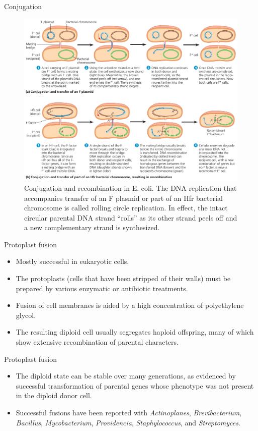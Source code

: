 \documentclass[ignorenonframetext,aspectratio=169]{beamer}
\providecommand{\tightlist}{%
  \setlength{\itemsep}{0pt}\setlength{\parskip}{0pt}}
\begin{document}
\begin{frame}{Conjugation}
\protect\hypertarget{conjugation-2}{}

\begin{figure}
\includegraphics[width=0.5\linewidth]{./../images/bacterial_conjugation2} \caption{Conjugation and recombination in E. coli. The DNA replication that accompanies transfer of an F plasmid or part of an Hfr bacterial chromosome is called rolling circle replication. In effect, the intact circular parental DNA strand “rolls” as its other strand peels off and a new complementary strand is synthesized.}\label{fig:conjugation2}
\end{figure}

\end{frame}

\begin{frame}{Protoplast fusion}
\protect\hypertarget{protoplast-fusion}{}

\begin{itemize}
\tightlist
\item
  Mostly successful in eukaryotic cells.
\item
  The protoplasts (cells that have been stripped of their walls) must be
  prepared by various enzymatic or antibiotic treatments.
\item
  Fusion of cell membranes is aided by a high concentration of
  polyethylene glycol.
\item
  The resulting diploid cell usually segregates haploid offspring, many
  of which show extensive recombination of parental characters.
\end{itemize}

\end{frame}

\begin{frame}{Protoplast fusion}
\protect\hypertarget{protoplast-fusion-1}{}

\begin{itemize}
\tightlist
\item
  The diploid state can be stable over many generations, as evidenced by
  successful transformation of parental genes whose phenotype was not
  present in the diploid donor cell.
\item
  Successful fusions have been reported with \emph{Actinoplanes},
  \emph{Brevibacterium}, \emph{Bacillus}, \emph{Mycobacterium},
  \emph{Providencia}, \emph{Staphylococcus}, and \emph{Streptomyces}.
\end{itemize}

\end{frame}
\end{document}
